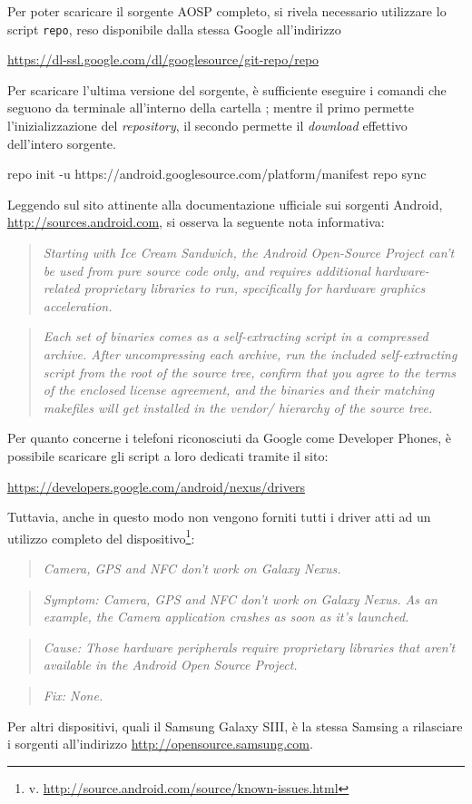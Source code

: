 Per poter scaricare il sorgente AOSP completo, si rivela necessario utilizzare
lo script \texttt{\small repo}, reso disponibile dalla stessa Google all'indirizzo
\begin{center}
\small
\url{https://dl-ssl.google.com/dl/googlesource/git-repo/repo}
\end{center}

Per scaricare l'ultima versione del sorgente, è  sufficiente
eseguire i comandi che seguono da terminale all'interno della cartella \AOSP; mentre il primo permette l'inizializzazione
del \textit{repository}, il secondo permette il \textit{download} effettivo dell'intero
sorgente.
\begin{bash}
repo init -u https://android.googlesource.com/platform/manifest
repo sync
\end{bash}
\medskip

Leggendo sul sito attinente alla documentazione ufficiale sui sorgenti Android,
\url{http://sources.android.com}, si osserva la seguente nota informativa:
\begin{quotation}
\textit{
Starting with Ice Cream Sandwich, the Android Open-Source Project can't be used from pure source code only, and requires additional hardware-related proprietary libraries to run, specifically for hardware graphics acceleration.
}
\end{quotation}
\begin{quotation}
\textit{
Each set of binaries comes as a self-extracting script in a compressed archive. After uncompressing each archive, run the included self-extracting script from the root of the source tree, confirm that you agree to the terms of the enclosed license agreement, and the binaries and their matching makefiles will get installed in the vendor/ hierarchy of the source tree.
}
\end{quotation}
Per quanto concerne i telefoni riconosciuti da Google come Developer Phones, è
possibile scaricare gli script a loro dedicati tramite il sito:
\begin{center}
\url{https://developers.google.com/android/nexus/drivers}
\end{center}
Tuttavia, anche in questo modo non vengono forniti tutti i driver atti ad un utilizzo
completo del dispositivo\footnote{v. \url{http://source.android.com/source/known-issues.html}}:
\begin{quotation}
\textit{Camera, GPS and NFC don't work on Galaxy Nexus.}
\end{quotation}
\begin{quotation}
\textit{Symptom: Camera, GPS and NFC don't work on Galaxy Nexus. As an example, the Camera application crashes as soon as it's launched.}
\end{quotation}
\begin{quotation}
\textit{Cause: Those hardware peripherals require proprietary libraries that aren't available in the Android Open Source Project.}
\end{quotation}
\begin{quotation}
\textit{Fix: None.}
\end{quotation}
Per altri dispositivi, quali il Samsung Galaxy SIII, è la stessa Samsing a rilasciare
i sorgenti all'indirizzo \url{http://opensource.samsung.com}.

